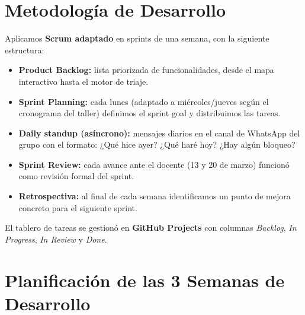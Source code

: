 \documentclass[12pt,a4paper]{article}
\begin{document}
\section{Metodología de Desarrollo}

Aplicamos \textbf{Scrum adaptado} en sprints de una semana, con la siguiente
estructura:

\begin{itemize}[leftmargin=1.5em]
  \item \textbf{Product Backlog:} lista priorizada de funcionalidades, desde
        el mapa interactivo hasta el motor de triaje.
  \item \textbf{Sprint Planning:} cada lunes (adaptado a miércoles/jueves
        según el cronograma del taller) definimos el sprint goal y distribuimos
        las tareas.
  \item \textbf{Daily standup (asíncrono):} mensajes diarios en el canal de
        WhatsApp del grupo con el formato: ¿Qué hice ayer? ¿Qué haré hoy?
        ¿Hay algún bloqueo?
  \item \textbf{Sprint Review:} cada avance ante el docente (13 y 20 de marzo)
        funcionó como revisión formal del sprint.
  \item \textbf{Retrospectiva:} al final de cada semana identificamos un punto
        de mejora concreto para el siguiente sprint.
\end{itemize}

El tablero de tareas se gestionó en \textbf{GitHub Projects} con columnas
\textit{Backlog}, \textit{In Progress}, \textit{In Review} y \textit{Done}.

\section{Planificación de las 3 Semanas de Desarrollo}
\end{document}
